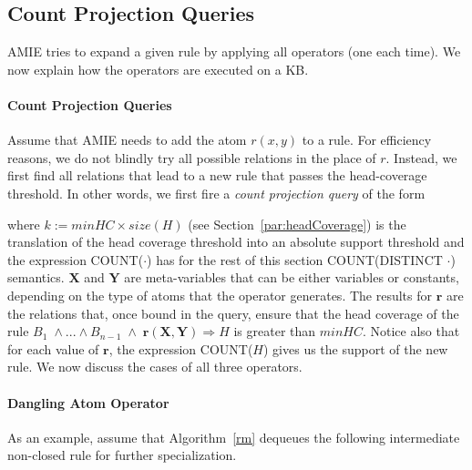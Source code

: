 \subsection{Count Projection Queries}
\label{subsec:countqueries}

AMIE tries to expand a given rule by applying all operators (one each time). We now explain how the operators are executed on a KB.

\paragraph{Count Projection Queries} 
Assume that AMIE needs to add the atom $r(x,y)$ to a rule. 
For efficiency reasons, we do not blindly try all possible relations in the place of $r$. Instead, we first 
find all relations that lead to a new rule that passes the head-coverage threshold.
In other words, we first fire a \emph{count projection query} of the form


\noindent where $k := minHC \times size(H)$ (see Section~\ref{par:headCoverage}) is the translation of the
head coverage threshold into an absolute support threshold and the expression COUNT($\cdot$) has for the rest of this section COUNT(DISTINCT $\cdot$) semantics.
$\bm{X}$ and $\bm{Y}$ are meta-variables that
can be either variables or constants, 
depending on the type of atoms that the operator generates. The results for $\bm{r}$ are the relations that, once bound in the query, ensure that the head coverage 
of the rule $B_1 \; \wedge ... \wedge B_{n-1} \;\wedge\; \bm{r}(\bm{X},\bm{Y}) \Rightarrow H$ is greater than $minHC$.
Notice also that for each value of $\bm{r}$, the expression COUNT($H$) gives us the support of the new rule.
We now discuss the cases of all three operators.

\paragraph{Dangling Atom Operator} 
As an example, assume that Algorithm~\ref{rm} dequeues the following intermediate non-closed rule for further specialization.

